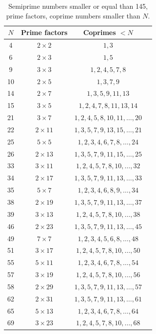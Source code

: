 \documentclass[conference,twoside]{IEEEtran}
\begin{document}
\begin{table}[h]
\centering
\caption{Semiprime numbers smaller or equal than 145, prime factors, coprime numbers smaller than $N$.}
\label{tab:min_a}
\begin{tabular}{c c c c}
\toprule
$N$ & Prime factors & Coprimes $< N$ \\
\midrule
4 & $2 \times 2$ & $1, 3$  \\
6 & $2 \times 3$ & $1, 5$  \\
9 & $3 \times 3$ & $1, 2, 4, 5, 7, 8$  \\
10 & $2 \times 5$ & $1, 3, 7, 9$  \\
14 & $2 \times 7$ & $1, 3, 5, 9, 11, 13$  \\
15 & $3 \times 5$ & $1, 2, 4, 7, 8, 11, 13, 14$  \\
21 & $3 \times 7$ & $1, 2, 4, 5, 8, 10, 11, \ldots, 20$  \\
22 & $2 \times 11$ & $1, 3, 5, 7, 9, 13, 15, \ldots, 21$  \\
25 & $5 \times 5$ & $1, 2, 3, 4, 6, 7, 8, \ldots, 24$  \\
26 & $2 \times 13$ & $1, 3, 5, 7, 9, 11, 15, \ldots, 25$  \\
33 & $3 \times 11$ & $1, 2, 4, 5, 7, 8, 10, \ldots, 32$  \\
34 & $2 \times 17$ & $1, 3, 5, 7, 9, 11, 13, \ldots, 33$  \\
35 & $5 \times 7$ & $1, 2, 3, 4, 6, 8, 9, \ldots, 34$  \\
38 & $2 \times 19$ & $1, 3, 5, 7, 9, 11, 13, \ldots, 37$  \\
39 & $3 \times 13$ & $1, 2, 4, 5, 7, 8, 10, \ldots, 38$  \\
46 & $2 \times 23$ & $1, 3, 5, 7, 9, 11, 13, \ldots, 45$ \\
49 & $7 \times 7$ & $1, 2, 3, 4, 5, 6, 8, \ldots, 48$  \\
51 & $3 \times 17$ & $1, 2, 4, 5, 7, 8, 10, \ldots, 50$  \\
55 & $5 \times 11$ & $1, 2, 3, 4, 6, 7, 8, \ldots, 54$  \\
57 & $3 \times 19$ & $1, 2, 4, 5, 7, 8, 10, \ldots, 56$  \\
58 & $2 \times 29$ & $1, 3, 5, 7, 9, 11, 13, \ldots, 57$  \\
62 & $2 \times 31$ & $1, 3, 5, 7, 9, 11, 13, \ldots, 61$  \\
65 & $5 \times 13$ & $1, 2, 3, 4, 6, 7, 8, \ldots, 64$  \\
69 & $3 \times 23$ & $1, 2, 4, 5, 7, 8, 10, \ldots, 68$ \\

\end{tabular}
\end{table}
\end{document}
